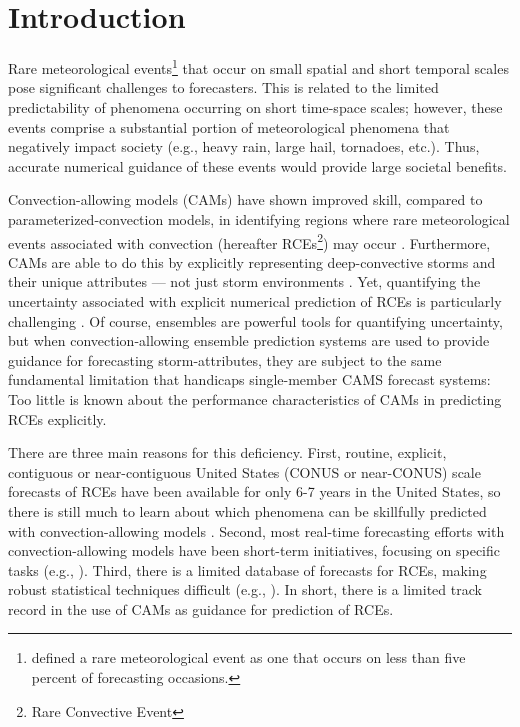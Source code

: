 

\chapter{Introduction}
\label{intro}

Rare meteorological events\footnote{\cite{Murphy1991} defined a rare meteorological event as one that occurs on less than five percent of forecasting occasions.} that occur on small spatial and short temporal scales pose significant challenges to forecasters. This is related to the limited predictability of phenomena occurring on short time-space scales; however, these events comprise a substantial portion of meteorological phenomena that negatively impact society (e.g., heavy rain, large hail, tornadoes, etc.). Thus, accurate numerical guidance of these events would provide large societal benefits.

Convection-allowing models (CAMs) have shown improved skill, compared to parameterized-convection models, in identifying regions where rare meteorological events associated with convection (hereafter RCEs\footnote{Rare Convective Event}) may occur \citep{Clark2010a}. Furthermore, CAMs are able to do this by explicitly representing deep-convective storms and their unique attributes --- not just storm environments \citep{Kain2010}. Yet, quantifying the uncertainty associated with explicit numerical prediction of RCEs is particularly challenging \citep{Sobash2011}. Of course, ensembles are powerful tools for quantifying uncertainty, but when convection-allowing ensemble prediction systems are used to provide guidance for forecasting storm-attributes, they are subject to the same fundamental limitation that handicaps single-member CAMS forecast systems: Too little is known about the performance characteristics of CAMs in predicting RCEs explicitly.

There are three main reasons for this deficiency. First, routine, explicit, contiguous  or near-contiguous United States (CONUS or near-CONUS) scale forecasts of RCEs have been available for only 6-7 years in the United States, so there is still much to learn about which phenomena can be skillfully predicted with convection-allowing models \citep{Kain2008, Kain2010}. Second, most real-time forecasting efforts with convection-allowing models have been short-term initiatives, focusing on specific tasks (e.g., \citealp{Done2004, Weisman2008}). Third, there is a limited database of forecasts for RCEs, making robust statistical techniques difficult (e.g., \citealp{Hamill2006}). In short, there is a limited track record in the use of CAMs as guidance for prediction of RCEs.

